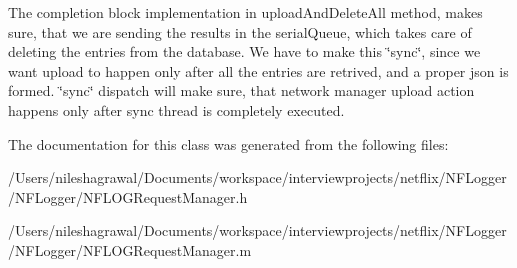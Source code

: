The completion block implementation in upload\+And\+Delete\+All method, makes sure, that we are sending the results in the serial\+Queue, which takes care of deleting the entries from the database. We have to make this \char`\"{}sync\char`\"{}, since we want upload to happen only after all the entries are retrived, and a proper json is formed. \char`\"{}sync\char`\"{} dispatch will make sure, that network manager upload action happens only after sync thread is completely executed.

The documentation for this class was generated from the following files\+:\begin{DoxyCompactItemize}
\item 
/\+Users/nileshagrawal/\+Documents/workspace/interviewprojects/netflix/\+N\+F\+Logger/\+N\+F\+Logger/N\+F\+L\+O\+G\+Request\+Manager.\+h\item 
/\+Users/nileshagrawal/\+Documents/workspace/interviewprojects/netflix/\+N\+F\+Logger/\+N\+F\+Logger/N\+F\+L\+O\+G\+Request\+Manager.\+m\end{DoxyCompactItemize}
